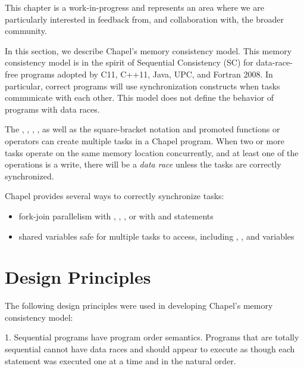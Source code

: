 \label{Memory_Consistency_Model}

\begin{openissue}
  This chapter is a work-in-progress and represents an area where we
  are particularly interested in feedback from, and collaboration
  with, the broader community.
\end{openissue}

In this section, we describe Chapel's memory consistency model. This memory
consistency model is in the spirit of Sequential Consistency (SC) for
data-race-free programs adopted by C11, C++11, Java, UPC, and Fortran 2008. In
particular, correct programs will use synchronization constructs when tasks
communicate with each other. This model does not define the behavior of
programs with
data races.

The , , , , as well as
the 
square-bracket  notation and promoted functions or operators can
create multiple tasks in a Chapel program. When two or more tasks operate on
the same memory location concurrently, and at least one of the operations is a
write, there will be a \textit{data race} unless the tasks are correctly
synchronized.

Chapel provides several ways to correctly synchronize
tasks:

\begin{itemize}

  \item fork-join parallelism with , ,
, or with  and  statements

  \item shared variables safe for multiple tasks to access, including
, , and  variables

\end{itemize}

\section{Design Principles}

The following design principles were used in developing Chapel's memory
consistency model:

1. Sequential programs have program order semantics.
   Programs that are totally sequential cannot have data races and should
   appear to execute as though each statement was executed one at a time and in
   the natural order.

